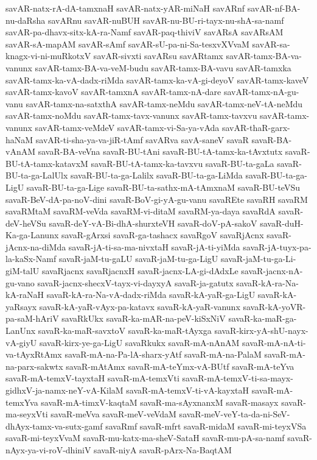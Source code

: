 {savAR-natx-rA-dA-tamxnaH
savAR-natx-yAR-miNaH
savARnf
savAR-nf-BA-nu-daRsha
savARnu
savAR-nuBUH
savAR-nu-BU-ri-tayx-nu-shA-sa-namf
savAR-pa-dhavx-sitx-kA-ra-Namf
savAR-paq-thiviV
savARsA
savARsAM
savAR-sA-mapAM
savAR-sAmf
savAR-sU-pa-ni-Sa-tesxvXVvaM
savAR-sa-knagx-vi-ni-muRkotxV
savAR-sivxti
savARsu
savARtamx
savAR-tamx-BA-va-vanunx
savAR-tamx-BA-va-veM-budu
savAR-tamx-BA-vavu
savAR-tamxka
savAR-tamx-ka-vA-dadx-riMda
savAR-tamx-ka-vA-gi-deyoV
savAR-tamx-kaveV
savAR-tamx-kavoV
savAR-tamxnA
savAR-tamx-nA-dare
savAR-tamx-nA-gu-vanu
savAR-tamx-na-satxthA
savAR-tamx-neMdu
savAR-tamx-neV-tA-neMdu
savAR-tamx-noMdu
savAR-tamx-tavx-vanunx
savAR-tamx-tavxvu
savAR-tamx-vanunx
savAR-tamx-veMdeV
savAR-tamx-vi-Sa-ya-vAda
savAR-thaR-garx-haNaM
savAR-ti-sha-ya-va-jiR-tAmf
savARva
savA-saneV
savaR
savaR-BA-vAnAM
savaR-BA-veVna
savaR-BU-tAni
savaR-BU-tA-tamx-ka-tAvxtutx
savaR-BU-tA-tamx-katavxM
savaR-BU-tA-tamx-ka-tavxvu
savaR-BU-ta-gaLa
savaR-BU-ta-ga-LalUlx
savaR-BU-ta-ga-Lalilx
savaR-BU-ta-ga-LiMda
savaR-BU-ta-ga-LigU
savaR-BU-ta-ga-Lige
savaR-BU-ta-sathx-mA-tAmxnaM
savaR-BU-teVSu
savaR-BeV-dA-pa-noV-dini
savaR-BoV-gi-yA-gu-vanu
savaREte
savaRH
savaRM
savaRMtaM
savaRM-veVda
savaRM-vi-ditaM
savaRM-ya-daya
savaRdA
savaR-deV-heVSu
savaR-deY-vA-Bi-dhA-shurxteVH
savaR-doV-pA-sakoV
savaR-duH-Ka-ga-Lanunx
savaR-gArxsi
savaR-ga-tashacx
savaRgoV
savaRjAcnx
savaR-jAcnx-na-diMda
savaR-jA-ti-sa-ma-nivxtaH
savaR-jA-ti-yiMda
savaR-jA-tuyx-pa-la-kaSx-Namf
savaR-jaM-tu-gaLU
savaR-jaM-tu-ga-LigU
savaR-jaM-tu-ga-Li-giM-talU
savaRjacnx
savaRjacnxH
savaR-jacnx-LA-gi-dAdxLe
savaR-jacnx-nA-gu-vano
savaR-jacnx-shecxV-tayx-vi-dayxyA
savaR-ja-gatutx
savaR-kA-ra-Na-kA-raNaH
savaR-kA-ra-Na-vA-dadx-riMda
savaR-kA-yaR-ga-LigU
savaR-kA-yaRsayx
savaR-kA-yaR-vAyx-pa-katavx
savaR-kA-yaR-vanunx
savaR-kA-yoVR-pa-saM-hAriV
savaRkUkx
savaR-ka-mAR-na-peV-kiSxNiV
savaR-ka-maR-ga-LanUnx
savaR-ka-maR-savxtoV
savaR-ka-maR-tAyxga
savaR-kirx-yA-shU-nayx-vA-giyU
savaR-kirx-ye-ga-LigU
savaRkukx
savaR-mA-nAnAM
savaR-mA-nA-ti-va-tAyxRtAmx
savaR-mA-na-Pa-lA-sharx-yAtf
savaR-mA-na-PalaM
savaR-mA-na-parx-sakwtx
savaR-mAtAmx
savaR-mA-teYmx-vA-BUtf
savaR-mA-teYva
savaR-mA-temxV-tayxtaH
savaR-mA-temxVti
savaR-mA-temxV-ti-sa-mayx-gidhxV-ja-namx-neY-vA-KilaM
savaR-mA-temxV-ti-vA-kayxtaH
savaR-mA-temxYva
savaR-mA-timxV-kaqtaM
savaR-ma-sAyxnanxM
savaR-masayx
savaR-ma-seyxVti
savaR-meVva
savaR-meV-veVdaM
savaR-meV-veY-ta-da-ni-SeV-dhAyx-tamx-va-sutx-gamf
savaRmf
savaR-mfrt
savaR-midaM
savaR-mi-teyxVSa
savaR-mi-teyxVvaM
savaR-mu-katx-ma-sheV-SataH
savaR-mu-pA-sa-namf
savaR-nAyx-ya-vi-roV-dhiniV
savaR-niyA
savaR-pArx-Na-BaqtAM
}

